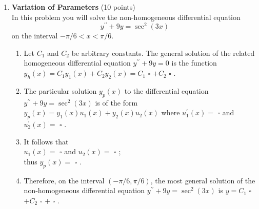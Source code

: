 \begin{enumerate}
  \item \textbf{Variation of Parameters} (10 points)\\
  In this problem you will solve the non-homogeneous differential equation
  $$
  y^{\prime \prime}+9 y=\sec ^2(3 x)
  $$
  on the interval $-\pi / 6<x<\pi / 6$.
  \begin{enumerate}[label=\arabic*.]
    \item Let $C_1$ and $C_2$ be arbitrary constants. The general solution of the related homogeneous differential equation $y^{\prime \prime}+9 y=0$ is the function $y_h(x)=C_1 y_1(x)+C_2 y_2(x)=C_1$ $\square$ $+C_2$ $\square$ .\\
    \begin{subanswer}
    \end{subanswer}
    \item The particular solution $y_p(x)$ to the differential equation $y^{\prime \prime}+9 y=\sec ^2(3 x)$ is of the form $y_p(x)=y_1(x) u_1(x)+y_2(x) u_2(x)$ where $u_1^{\prime}(x)=$ $\square$ and $u_2^{\prime}(x)=$ $\square$ .\\
    \begin{subanswer}
    \end{subanswer}
    \item It follows that\\
    $u_1(x)=$ $\square$ and $u_2(x)=$ $\square$ ;\\
    thus $y_p(x)=$ $\square$ .\\
    \begin{subanswer}
    \end{subanswer}
    \item Therefore, on the interval $(-\pi / 6, \pi / 6)$, the most general solution of the non-homogeneous differential equation $y^{\prime \prime}+9 y=\sec ^2(3 x)$ is $y=C_1$ $\square$ $+C_2$ $\square$ $+$ $\square$ .\\
    \begin{subanswer}
    \end{subanswer}
  \end{enumerate}

  \newpage


\end{enumerate}
